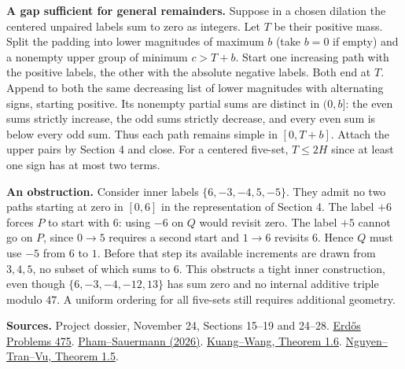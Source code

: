 \documentclass[11pt]{article}
\begin{document}
\textbf{A gap sufficient for general remainders.} Suppose in a chosen dilation the centered unpaired labels sum to zero as integers. Let $T$ be their positive mass. Split the padding into lower magnitudes of maximum $b$ (take $b=0$ if empty) and a nonempty upper group of minimum $c>T+b$. Start one increasing path with the positive labels, the other with the absolute negative labels. Both end at $T$. Append to both the same decreasing list of lower magnitudes with alternating signs, starting positive. Its nonempty partial sums are distinct in $(0,b]$: the even sums strictly increase, the odd sums strictly decrease, and every even sum is below every odd sum. Thus each path remains simple in $[0,T+b]$. Attach the upper pairs by Section 4 and close. For a centered five-set, $T\le 2H$ since at least one sign has at most two terms.

\textbf{An obstruction.} Consider inner labels $\{6,-3,-4,5,-5\}$. They admit no two paths starting at zero in $[0,6]$ in the representation of Section 4. The label $+6$ forces $P$ to start with $6$: using $-6$ on $Q$ would revisit zero. The label $+5$ cannot go on $P$, since $0\to5$ requires a second start and $1\to6$ revisits $6$. Hence $Q$ must use $-5$ from $6$ to $1$. Before that step its available increments are drawn from $3,4,5$, no subset of which sums to $6$. This obstructs a tight inner construction, even though $\{6,-3,-4,-12,13\}$ has sum zero and no internal additive triple modulo $47$. A uniform ordering for all five-sets still requires additional geometry.

\small
\textbf{Sources.} Project dossier, November 24, Sections 15--19 and 24--28.
\href{https://www.erdosproblems.com/475}{Erd\H{o}s Problems 475}.
\href{https://arxiv.org/abs/2602.15797}{Pham--Sauermann (2026)}.
\href{https://arxiv.org/abs/2610.34424}{Kuang--Wang, Theorem 1.6}.
\href{https://arxiv.org/abs/2610.40712}{Nguyen--Tran--Vu, Theorem 1.5}.
\end{document}
